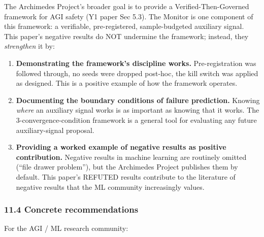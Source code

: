 \documentclass[
]{article}
\begin{document}
The Archimedes Project's broader goal is to provide a
Verified-Then-Governed framework for AGI safety (Y1 paper Sec 5.3). The
Monitor is one component of this framework: a verifiable,
pre-registered, sample-budgeted auxiliary signal. This paper's negative
results do NOT undermine the framework; instead, they \emph{strengthen}
it by:

\begin{enumerate}
\def\labelenumi{\arabic{enumi}.}
\item
  \textbf{Demonstrating the framework's discipline works.}
  Pre-registration was followed through, no seeds were dropped post-hoc,
  the kill switch was applied as designed. This is a positive example of
  how the framework operates.
\item
  \textbf{Documenting the boundary conditions of failure prediction.}
  Knowing \emph{where} an auxiliary signal works is as important as
  knowing that it works. The 3-convergence-condition framework is a
  general tool for evaluating any future auxiliary-signal proposal.
\item
  \textbf{Providing a worked example of negative results as positive
  contribution.} Negative results in machine learning are routinely
  omitted (``file drawer problem''), but the Archimedes Project
  publishes them by default. This paper's REFUTED results contribute to
  the literature of negative results that the ML community increasingly
  values.
\end{enumerate}

\subsubsection{11.4 Concrete
recommendations}\label{concrete-recommendations}

For the AGI / ML research community:
\end{document}
